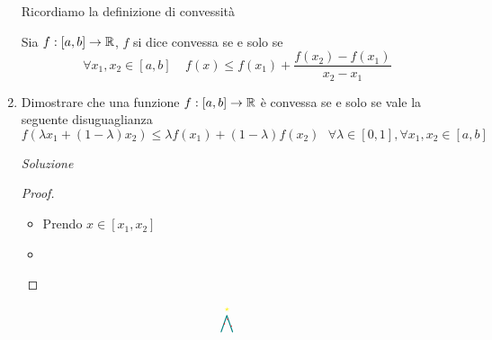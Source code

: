 \documentclass{article}
\begin{document}
\begin{enumerate}[label=\textbf{Esercizio 12.\arabic*.},itemindent=*]
Ricordiamo la definizione di convessità
\begin{shaded}
    \begin{definition}[Convessità]
        Sia $f:[a,b]\to\mathbb{R}$, $f$ si dice convessa se e solo se
        \[\forall x_1,x_2\in [a,b]~~~~~f(x)\leq f(x_1)+\frac{f(x_2)-f(x_1)}{x_2-x_1}\]
    \end{definition}
\end{shaded}
\item Dimostrare che una funzione $f:[a,b]\to\mathbb{R}$ è convessa se e solo se vale la seguente disuguaglianza
\[f(\lambda x_1+(1-\lambda)x_2)\leq \lambda f(x_1)+(1-\lambda)f(x_2)~~~\forall \lambda \in [0,1], \forall x_1,x_2\in [a,b]\]
\item[\textit{\large Soluzione~}]~
\begin{proof}~
    \begin{itemize}
        \item \say{$\Rightarrow$}
        Prendo $x \in [x_1,x_2]$
        \item \say{$\Leftarrow$}
    \end{itemize}
\end{proof}
\end{enumerate}
\[\christmaswedge\]
\end{document}
